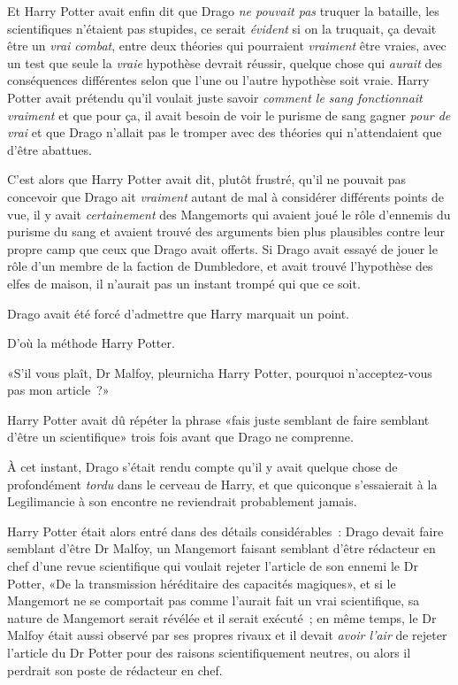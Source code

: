 Et Harry Potter avait enfin dit que Drago \emph{ne pouvait pas} truquer la bataille, les scientifiques n'étaient pas stupides, ce serait \emph{évident} si on la truquait, ça devait être un \emph{vrai combat}, entre deux théories qui pourraient \emph{vraiment} être vraies, avec un test que seule la \emph{vraie} hypothèse devrait réussir, quelque chose qui \emph{aurait} des conséquences différentes selon que l'une ou l'autre hypothèse soit vraie. Harry Potter avait prétendu qu'il voulait juste savoir \emph{comment le sang fonctionnait vraiment} et que pour ça, il avait besoin de voir le purisme de sang gagner \emph{pour de vrai} et que Drago n'allait pas le tromper avec des théories qui n'attendaient que d'être abattues.

C'est alors que Harry Potter avait dit, plutôt frustré, qu'il ne pouvait pas concevoir que Drago ait \emph{vraiment} autant de mal à considérer différents points de vue, il y avait \emph{certainement} des Mangemorts qui avaient joué le rôle d'ennemis du purisme du sang et avaient trouvé des arguments bien plus plausibles contre leur propre camp que ceux que Drago avait offerts. Si Drago avait essayé de jouer le rôle d'un membre de la faction de Dumbledore, et avait trouvé l'hypothèse des elfes de maison, il n'aurait pas un instant trompé qui que ce soit.

Drago avait été forcé d'admettre que Harry marquait un point.

D'où la méthode Harry Potter.

«S'il vous plaît, Dr Malfoy, pleurnicha Harry Potter, pourquoi n'acceptez-vous pas mon article~?»

Harry Potter avait dû répéter la phrase «fais juste semblant de faire semblant d'être un scientifique» trois fois avant que Drago ne comprenne.

À cet instant, Drago s'était rendu compte qu'il y avait quelque chose de profondément \emph{tordu} dans le cerveau de Harry, et que quiconque s'essaierait à la Legilimancie à son encontre ne reviendrait probablement jamais.

Harry Potter était alors entré dans des détails considérables~: Drago devait faire semblant d'être Dr Malfoy, un Mangemort faisant semblant d'être rédacteur en chef d'une revue scientifique qui voulait rejeter l'article de son ennemi le Dr Potter, «De la transmission héréditaire des capacités magiques», et si le Mangemort ne se comportait pas comme l'aurait fait un vrai scientifique, sa nature de Mangemort serait révélée et il serait exécuté~; en même temps, le Dr Malfoy était aussi observé par ses propres rivaux et il devait \emph{avoir l'air} de rejeter l'article du Dr Potter pour des raisons scientifiquement neutres, ou alors il perdrait son poste de rédacteur en chef.

